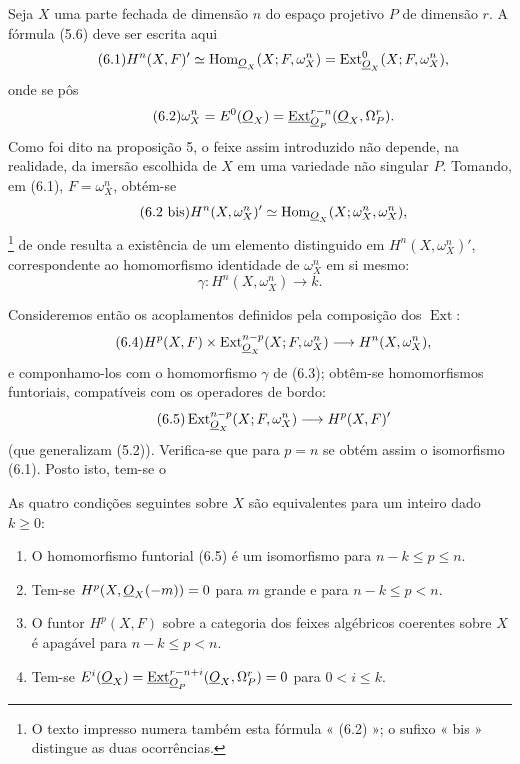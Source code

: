 
Seja $X$ uma parte fechada de dimensão $n$ do espaço projetivo $P$ de
dimensão $r$. A fórmula (5.6) deve ser escrita aqui
\begin{equation}\tag{6.1}
  H^{n}(X,F)'
  \simeq\operatorname{Hom}_{\underline{O}_X}(X;F,\omega_X^{n})
  =\operatorname{Ext}_{\underline{O}_X}^{0}(X;F,\omega_X^{n}),
\end{equation}
onde se pôs
\begin{equation}\tag{6.2}
  \omega_X^{n}=E^{0}(\underline{O}_X)
  =\underline{\operatorname{Ext}}_{\underline{O}_P}^{r-n}(\underline{O}_X,\Omega_P^{r}).
\end{equation}
Como foi dito na proposição 5, o feixe assim introduzido não depende,
na realidade, da imersão escolhida de $X$ em uma variedade não singular $P$.
Tomando, em (6.1), $F=\omega_X^{n}$, obtém-se
\begin{equation}\tag{6.2 bis}
  H^{n}(X,\omega_X^{n})'
  \simeq\operatorname{Hom}_{\underline{O}_X}(X;\omega_X^{n},\omega_X^{n}),
\end{equation}
\footnote{O texto impresso numera também esta fórmula « (6.2) »; o sufixo
« bis » distingue as duas ocorrências.} de onde resulta a existência de um elemento
distinguido em $H^{n}(X,\omega_X^{n})'$, correspondente ao homomorfismo
identidade de $\omega_X^{n}$ em si mesmo:
\begin{equation}\tag{6.3}
  \gamma:H^{n}(X,\omega_X^{n})\longrightarrow k.
\end{equation}

Consideremos então os acoplamentos definidos pela composição dos $\operatorname{Ext}$:
\begin{equation}\tag{6.4}
  H^{p}(X,F)\times
  \operatorname{Ext}_{\underline{O}_X}^{n-p}(X;F,\omega_X^{n})
  \longrightarrow H^{n}(X,\omega_X^{n}),
\end{equation}
e componhamo-los com o homomorfismo $\gamma$ de (6.3); obtêm-se
homomorfismos funtoriais, compatíveis com os operadores de bordo:
\begin{equation}\tag{6.5}
  \operatorname{Ext}_{\underline{O}_X}^{n-p}(X;F,\omega_X^{n})
  \longrightarrow H^{p}(X,F)'
\end{equation}
(que generalizam (5.2)). Verifica-se que para $p=n$ se obtém assim
o isomorfismo (6.1). Posto isto, tem-se o

 As quatro condições seguintes sobre $X$ são
equivalentes para um inteiro dado $k\geq0$:
\begin{enumerate}
  \item[\textit{i.}] O homomorfismo funtorial (6.5) é um isomorfismo para
    $n-k\leq p\leq n$.
  \item[\textit{ii.}] Tem-se $H^{p}(X,\underline{O}_X(-m))=0$ para $m$ grande e para
    $n-k\leq p<n$.
  \item[\textit{iii.}] O funtor $H^{p}(X,F)$ sobre a categoria dos feixes
    algébricos coerentes sobre $X$ é apagável para $n-k\leq p<n$.
  \item[\textit{iv.}] Tem-se
    $E^{i}(\underline{O}_X)=\underline{\operatorname{Ext}}_{\underline{O}_P}^{r-n+i}(\underline{O}_X,\Omega_P^{r})=0$
    para $0<i\leq k$.
\end{enumerate}

